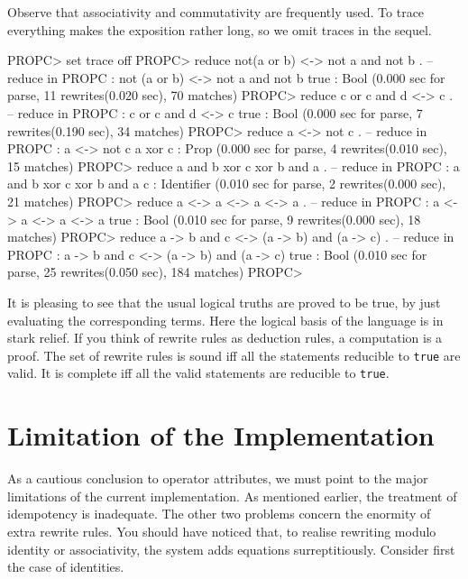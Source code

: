 \documentclass[a4paper]{memoir}
\begin{document}
Observe that associativity and commutativity are frequently used.
To trace everything makes the exposition rather long, so we omit
traces in the sequel.
\begin{vvtm}
\begin{ccode}
  PROPC> set trace off
  PROPC>  reduce not(a or b) <-> not a and not b .
  -- reduce in PROPC : not (a or b) <-> not a and not b
  true : Bool
  (0.000 sec for parse, 11 rewrites(0.020 sec), 70 matches)
  PROPC> reduce c or c and d <-> c .
  -- reduce in PROPC : c or c and d <-> c
  true : Bool
  (0.000 sec for parse, 7 rewrites(0.190 sec), 34 matches)
  PROPC> reduce a <-> not c .
  -- reduce in PROPC : a <-> not c
  a xor c : Prop
  (0.000 sec for parse, 4 rewrites(0.010 sec), 15 matches)
  PROPC> reduce a and b xor c xor b and a .
  -- reduce in PROPC : a and b xor c xor b and a
  c : Identifier
  (0.010 sec for parse, 2 rewrites(0.000 sec), 21 matches)
  PROPC> reduce a <-> a <-> a <-> a .
  -- reduce in PROPC : a <-> a <-> a <-> a
  true : Bool
  (0.010 sec for parse, 9 rewrites(0.000 sec), 18 matches)
  PROPC> reduce a -> b and c <-> (a -> b) and (a -> c) .
  -- reduce in PROPC : a -> b and c <-> (a -> b) and (a -> c)
  true : Bool
  (0.010 sec for parse, 25 rewrites(0.050 sec), 184 matches)
  PROPC> 
\end{ccode}
\end{vvtm}
It is pleasing to see that the usual logical truths are proved
to be true, by just evaluating the corresponding terms.
Here the logical basis of the language is in stark relief.
If you think of rewrite rules as deduction rules, a computation is
a proof. The set of rewrite rules is sound iff all the statements
reducible to \verb|true| are valid. It is complete iff
all the valid statements are reducible to \verb|true|.

\section{Limitation of the Implementation}\label{sec:p2-op-attr-limit}

As a cautious conclusion to operator attributes, we must point to the
major limitations of
the current implementation. As mentioned earlier, the treatment of
idempotency is inadequate. The other two problems concern the
enormity of extra rewrite rules. You should have noticed that, to realise
rewriting modulo identity or associativity, the system adds equations
surreptitiously. Consider first the case of identities.
\end{document}
